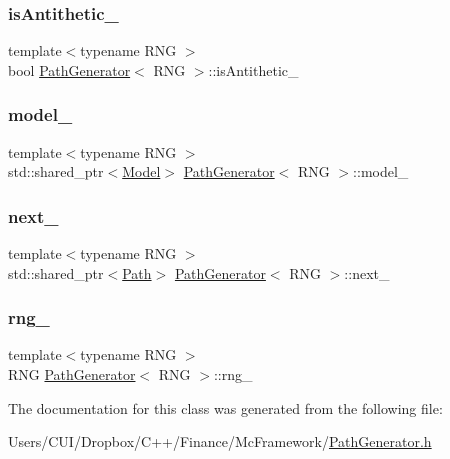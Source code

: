 \subsubsection{\texorpdfstring{is\+Antithetic\+\_\+}{isAntithetic\_}}
{\footnotesize\ttfamily template$<$typename R\+NG $>$ \\
bool \hyperlink{class_path_generator}{Path\+Generator}$<$ R\+NG $>$\+::is\+Antithetic\+\_\+\hspace{0.3cm}{\ttfamily [private]}}

\hypertarget{class_path_generator_a80dcaacd0b79c84c4bf83e980f5ed7ff}{}\label{class_path_generator_a80dcaacd0b79c84c4bf83e980f5ed7ff} 
\subsubsection{\texorpdfstring{model\+\_\+}{model\_}}
{\footnotesize\ttfamily template$<$typename R\+NG $>$ \\
std\+::shared\+\_\+ptr$<$\hyperlink{class_model}{Model}$>$ \hyperlink{class_path_generator}{Path\+Generator}$<$ R\+NG $>$\+::model\+\_\+\hspace{0.3cm}{\ttfamily [private]}}

\hypertarget{class_path_generator_a2af5b3cab0498565a56b20e97a3d6f35}{}\label{class_path_generator_a2af5b3cab0498565a56b20e97a3d6f35} 
\subsubsection{\texorpdfstring{next\+\_\+}{next\_}}
{\footnotesize\ttfamily template$<$typename R\+NG $>$ \\
std\+::shared\+\_\+ptr$<$\hyperlink{class_path}{Path}$>$ \hyperlink{class_path_generator}{Path\+Generator}$<$ R\+NG $>$\+::next\+\_\+\hspace{0.3cm}{\ttfamily [private]}}

\hypertarget{class_path_generator_ae8b29fa9173cf38dfc448375163adf25}{}\label{class_path_generator_ae8b29fa9173cf38dfc448375163adf25} 
\subsubsection{\texorpdfstring{rng\+\_\+}{rng\_}}
{\footnotesize\ttfamily template$<$typename R\+NG $>$ \\
R\+NG \hyperlink{class_path_generator}{Path\+Generator}$<$ R\+NG $>$\+::rng\+\_\+\hspace{0.3cm}{\ttfamily [private]}}



The documentation for this class was generated from the following file\+:\begin{DoxyCompactItemize}
\item 
Users/\+C\+U\+I/\+Dropbox/\+C++/\+Finance/\+Mc\+Framework/\hyperlink{_path_generator_8h}{Path\+Generator.\+h}\end{DoxyCompactItemize}
